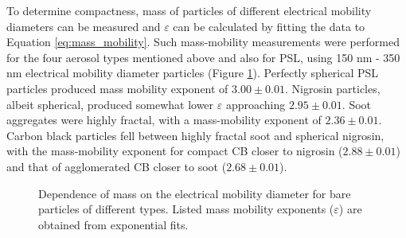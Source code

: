 To determine compactness, mass of particles of different electrical mobility diameters can be measured and $\varepsilon$ can be calculated by fitting the data to Equation \ref{eq:mass_mobility}. Such mass-mobility measurements were performed for the four aerosol types mentioned above and also for PSL, using 150 nm - 350 nm electrical mobility diameter particles (Figure \ref{fig:mass_mobility}). Perfectly spherical PSL particles produced mass mobility exponent of $3.00\pm 0.01$. Nigrosin particles, albeit spherical, produced  somewhat lower $\varepsilon$ approaching $2.95\pm 0.01$. Soot aggregates were highly fractal, with a mass-mobility exponent of $2.36\pm 0.01$. Carbon black particles fell between highly fractal soot and spherical nigrosin, with the mass-mobility exponent for compact CB closer to nigrosin ($2.88\pm 0.01$) and that of agglomerated CB closer to soot ($2.68\pm 0.01$).

\begin{figure}[htp]
    \centering
    \caption{Dependence of mass on the electrical mobility diameter for bare particles of different types. Listed mass mobility exponents ($\varepsilon$) are obtained from exponential fits.}
    \label{fig:mass_mobility}
\end{figure}

